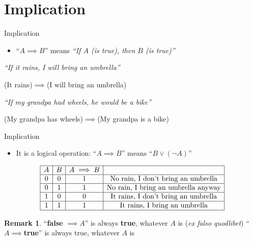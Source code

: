 \documentclass[11pt]{beamer}
\theoremstyle{definition}
\newtheorem {remark}{Remark}
\begin{document}
\section{Implication}

\begin{frame}{Implication}
  \begin{itemize}
  \item ``$A\implies B$'' means \emph{``If $A$ (is true), then $B$ (is true)''}
  \end{itemize}
  \pause
  \begin{example}
    \emph{``If it rains, I will bring an umbrella''}

    (It rains)$\implies$(I will bring an umbrella)
  \end{example}
  \pause
  \begin{example}
    \emph{``If my grandpa had wheels, he would be a bike''}

    (My grandpa has wheels)$\implies$(My grandpa is a bike)
  \end{example}
\end{frame}


\begin{frame}{Implication}
    \begin{itemize}
    \item It is a logical operation: ``$A\implies B$'' means ``$B\lor(\neg A)$''
      \pause
    \end{itemize}
  \begin{align*}
    \begin{array}{|c|c|c|c|}
      \hline
      A & B & A\implies B & \\
      \hline
      0 & 0 & 1 & \text{No rain, I don't bring an umbrella} \\
      \hline
      0 & 1 & 1 & \text{No rain, I bring an umbrella anyway} \\
      \hline
      1 & 0 & 0 & \text{It rains, I don't bring an umbrella} \\
      \hline
      1 & 1 & 1 & \text{It rains, I bring an umbrella} \\
      \hline
    \end{array}
  \end{align*}
  \pause
  \begin{remark}
    ``\textbf{false} $\implies A$'' is always \textbf{true}, whatever $A$ is
    (\emph{ex falso quodlibet})
    ``$A\implies$\textbf{true}'' is always true, whatever $A$ is
  \end{remark}
\end{frame}
\end{document}
